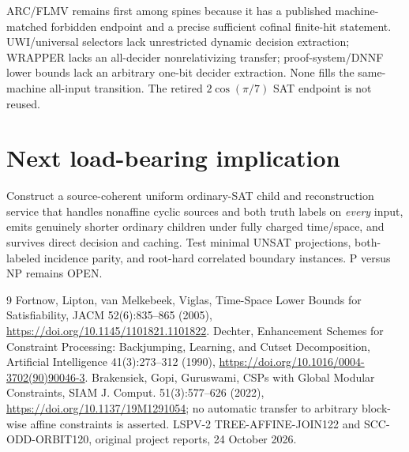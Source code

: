 \documentclass[11pt]{article}
\begin{document}
ARC/FLMV remains first among spines because it has a published machine-matched forbidden endpoint and a precise sufficient cofinal finite-hit statement. UWI/universal selectors lack unrestricted dynamic decision extraction; WRAPPER lacks an all-decider nonrelativizing transfer; proof-system/DNNF lower bounds lack an arbitrary one-bit decider extraction. None fills the same-machine all-input transition. The retired $2\cos(\pi/7)$ SAT endpoint is not reused.

\section{Next load-bearing implication}
Construct a source-coherent uniform ordinary-SAT child and reconstruction service that handles nonaffine cyclic sources and both truth labels on \emph{every} input, emits genuinely shorter ordinary children under fully charged time/space, and survives direct decision and caching. Test minimal UNSAT projections, both-labeled incidence parity, and root-hard correlated boundary instances. P versus NP remains OPEN.
\begin{thebibliography}{9}
 Fortnow, Lipton, van Melkebeek, Viglas, Time-Space Lower Bounds for Satisfiability, JACM 52(6):835--865 (2005), \url{https://doi.org/10.1145/1101821.1101822}.
 Dechter, Enhancement Schemes for Constraint Processing: Backjumping, Learning, and Cutset Decomposition, Artificial Intelligence 41(3):273--312 (1990), \url{https://doi.org/10.1016/0004-3702(90)90046-3}.
 Brakensiek, Gopi, Guruswami, CSPs with Global Modular Constraints, SIAM J. Comput. 51(3):577--626 (2022), \url{https://doi.org/10.1137/19M1291054}; no automatic transfer to arbitrary block-wise affine constraints is asserted.
 LSPV-2 TREE-AFFINE-JOIN122 and SCC-ODD-ORBIT120, original project reports, 24 October 2026.
\end{thebibliography}
\end{document}
